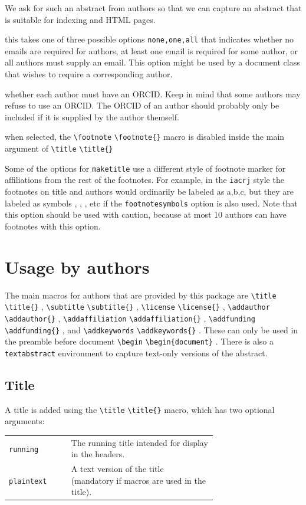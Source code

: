 \documentclass{article}
\newcommand{\cmd}[2][]{%
  \def\FirstArg{#1}%
  \ifx\FirstArg\empty%
    \texttt{\textbackslash{}#2}%
  \else%
    \texttt{\textbackslash{}#2\{#1\}}%
  \fi
}
\begin{document}
\begin{description}
We ask for such an abstract from authors so that we can capture an abstract
that is suitable for indexing and HTML pages.
\item[\texttt{emailreq}] this takes one of three possible options \texttt{none,one,all} that indicates whether
no emails are required for authors, at least one email is required for
some author, or all authors must supply an email. This option might be used by
a document class that wishes to require a corresponding author.
\item[\texttt{orcidreq}] whether each author must have an ORCID. Keep in mind that
some authors may refuse to use an ORCID. The ORCID of an author should probably only
be included if it is supplied by the author themself.
\item[\texttt{notitlefootnote}] when selected, the \cmd{footnote} macro is disabled inside
the main argument of \cmd{title}
\item[\texttt{footnotesymbols}] Some of the options for \texttt{maketitle} use a different
style of footnote marker for affiliations from the rest of the footnotes. For example, in the
\texttt{iacrj} style the footnotes on title and authors would ordinarily be 
labeled as a,b,c, but they are labeled as symbols
\textasteriskcentered, \dag, \ddag, etc if the \texttt{footnotesymbols} option is also used.
Note that this option should be used with caution, because at most 10 authors
can have footnotes with this option.
\end{description}
\section{Usage by authors}\label{authorusage}
The main macros for authors that are provided by this package
are \cmd{title}, \cmd{subtitle}, \cmd{license}, \cmd{addauthor},
\cmd{addaffiliation}, \cmd{addfunding}, and \cmd{addkeywords}.
These can only be used in the preamble before \cmd[document]{begin}.
There is also a \texttt{textabstract} environment
to capture text-only versions of the abstract.
\subsection{Title}
A title is added using the \cmd{title} macro, which has two optional arguments:

\newcommand{\argrow}[2]{\texttt{#1} & #2\\}
\newenvironment{arglist}{%
  \renewcommand{\arraystretch}{1.2}\begin{tabular}{@{}lp{0.7\linewidth}}%
  }{%
  \end{tabular}
  }
\begin{arglist}
    \argrow{running}{The running title intended for display in the headers.}
    \argrow{plaintext}{A text version of the title (mandatory if macros are used in the title).}
\end{arglist}
\end{document}
